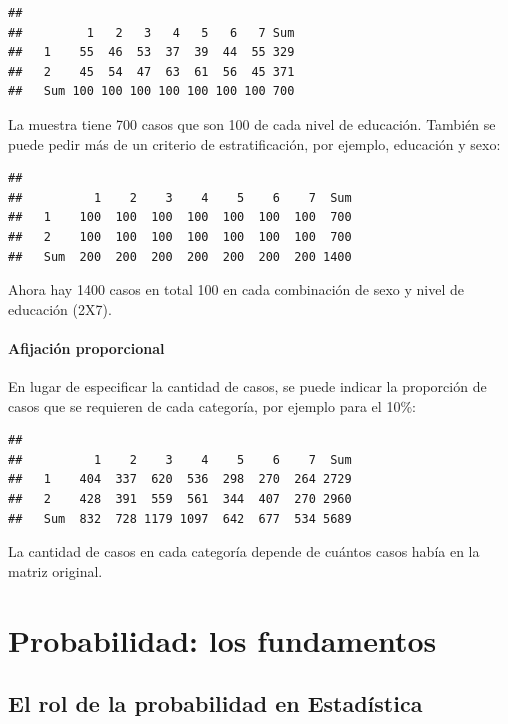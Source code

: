 \documentclass[]{book}
\begin{document}
\begin{verbatim}
##      
##         1   2   3   4   5   6   7 Sum
##   1    55  46  53  37  39  44  55 329
##   2    45  54  47  63  61  56  45 371
##   Sum 100 100 100 100 100 100 100 700
\end{verbatim}

La muestra tiene 700 casos que son 100 de cada nivel de educación. También se puede pedir más de un criterio de estratificación, por ejemplo, educación y sexo:

\begin{verbatim}
##      
##          1    2    3    4    5    6    7  Sum
##   1    100  100  100  100  100  100  100  700
##   2    100  100  100  100  100  100  100  700
##   Sum  200  200  200  200  200  200  200 1400
\end{verbatim}

Ahora hay 1400 casos en total 100 en cada combinación de sexo y nivel de educación (2X7).

\hypertarget{afijacion-proporcional}{%
\subsubsection{Afijación proporcional}\label{afijacion-proporcional}}

En lugar de especificar la cantidad de casos, se puede indicar la proporción de casos que se requieren de cada categoría, por ejemplo para el 10\%:

\begin{verbatim}
##      
##          1    2    3    4    5    6    7  Sum
##   1    404  337  620  536  298  270  264 2729
##   2    428  391  559  561  344  407  270 2960
##   Sum  832  728 1179 1097  642  677  534 5689
\end{verbatim}

La cantidad de casos en cada categoría depende de cuántos casos había en la matriz original.

\hypertarget{probabilidad-los-fundamentos}{%
\chapter{Probabilidad: los fundamentos}\label{probabilidad-los-fundamentos}}

\hypertarget{el-rol-de-la-probabilidad-en-estadistica}{%
\section{El rol de la probabilidad en Estadística}\label{el-rol-de-la-probabilidad-en-estadistica}}
\end{document}
